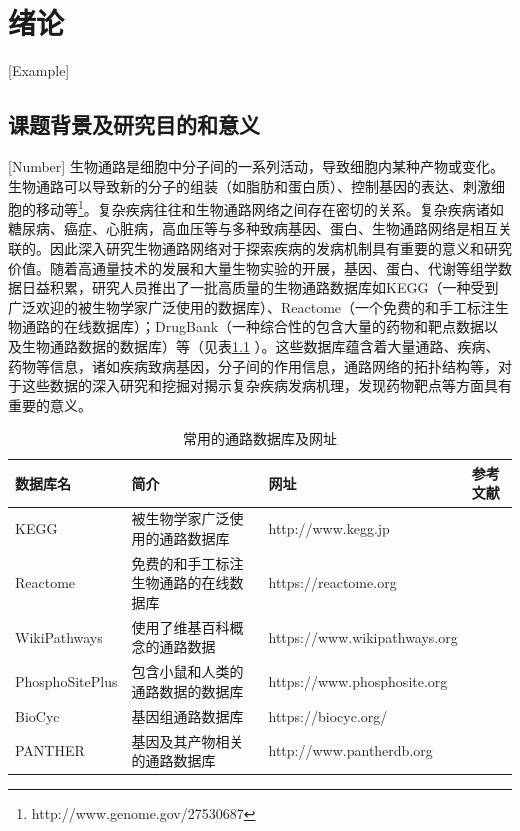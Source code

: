 \chapter{绪论}[Example]

\section{课题背景及研究目的和意义}[Number]
生物通路是细胞中分子间的一系列活动，导致细胞内某种产物或变化。生物通路可以导致新的分子的组装（如脂肪和蛋白质）、控制基因的表达、刺激细胞的移动等\footnote{http://www.genome.gov/27530687}。复杂疾病往往和生物通路网络之间存在密切的关系。复杂疾病诸如糖尿病、癌症、心脏病，高血压等与多种致病基因、蛋白、生物通路网络是相互关联的\cite{jin2011systematic}。因此深入研究生物通路网络对于探索疾病的发病机制具有重要的意义和研究价值。随着高通量技术的发展和大量生物实验的开展，基因、蛋白、代谢等组学数据日益积累，研究人员推出了一批高质量的生物通路数据库如KEGG\cite{kanehisa2008kegg}（一种受到广泛欢迎的被生物学家广泛使用的数据库）、Reactome\cite{croft2013reactome}（一个免费的和手工标注生物通路的在线数据库）；DrugBank\cite{wishart2006drugbank}（一种综合性的包含大量的药物和靶点数据以及生物通路数据的数据库）等（见表\ref{table1} ）。这些数据库蕴含着大量通路、疾病、药物等信息，诸如疾病致病基因，分子间的作用信息，通路网络的拓扑结构等，对于这些数据的深入研究和挖掘对揭示复杂疾病发病机理，发现药物靶点等方面具有重要的意义。

\begin{table}[htbp]
  \centering
	\caption[table1]{常用的通路数据库及网址}
\vspace{0.5em}\wuhao
\begin{tabularx}{1.0\textwidth}{lXXl}
\toprule[1.5pt]
数据库名 & 简介 & 网址 & 参考文献\\
\midrule[1pt]
KEGG & 被生物学家广泛使用的通路数据库 & http://www.kegg.jp & \cite{kanehisa2008kegg} \\
Reactome	& 免费的和手工标注生物通路的在线数据库	& https://reactome.org & \cite{croft2013reactome} \\
WikiPathways	& 使用了维基百科概念的通路数据	& https://www.wikipathways.org & \cite{pico2008wikipathways} \\
PhosphoSitePlus	& 包含小鼠和人类的通路数据的数据库 & https://www.phosphosite.org &	\cite{hornbeck2011phosphositeplus} \\
BioCyc 	& 基因组通路数据库& https://biocyc.org/	& \cite{krummenacker2005querying} \\
PANTHER	& 基因及其产物相关的通路数据库&http://www.pantherdb.org	& \cite{mi2016panther} \\
\bottomrule[1.5pt]
\end{tabularx}
\label{table1}
\end{table}

